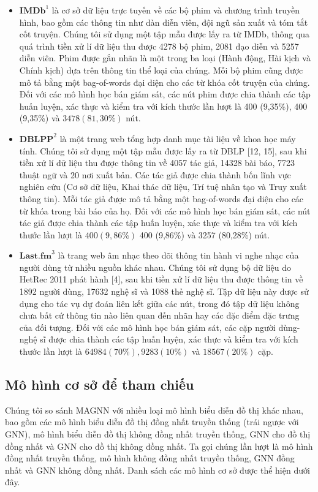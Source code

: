 \begin{itemize}
  \item $\mathbf{IMDb}^{1}$ là cơ sở dữ liệu trực tuyến về các bộ phim và chương trình truyền hình, bao gồm các thông tin như dàn diễn viên, đội ngũ sản xuất và tóm tắt cốt truyện. Chúng tôi sử dụng một tập mẫu được lấy ra từ IMDb, thông qua quá trình tiền xử lí dữ liệu thu được 4278 bộ phim, 2081 đạo diễn và 5257 diễn viên. Phim được gắn nhãn là một trong ba loại (Hành động, Hài kịch và Chính kịch) dựa trên thông tin thể loại của chúng. Mỗi bộ phim cũng được mô tả bằng một bag-of-words đại diện cho các từ khóa cốt truyện của chúng. Đối với các mô hình học bán giám sát, các nút phim được chia thành các tập huấn luyện, xác thực và kiểm tra với kích thước lần lượt là 400 (9,35\%), 400 (9,35\%) và $3478(81,30 \%)$ nút.
  \item $\mathbf{DBLPP}^{2}$ là một trang web tổng hợp danh mục tài liệu về khoa học máy tính. Chúng tôi sử dụng một tập mẫu được lấy ra từ DBLP [12, 15], sau khi tiền xử lí dữ liệu thu được thông tin về 4057 tác giả, 14328 bài báo, 7723 thuật ngữ và 20 nơi xuất bản. Các tác giả được chia thành bốn lĩnh vực nghiên cứu (Cơ sở dữ liệu, Khai thác dữ liệu, Trí tuệ nhân tạo và Truy xuất thông tin). Mỗi tác giả được mô tả bằng một bag-of-words đại diện cho các từ khóa trong bài báo của họ. Đối với các mô hình học bán giám sát, các nút tác giả được chia thành các tập huấn luyện, xác thực và kiểm tra với kích thước lần lượt là $400(9,86 \%)$ 400 (9,86\%) và 3257 (80,28\%) nút.
  \item $\mathbf{Last.fm}^{3}$ là trang web âm nhạc theo dõi thông tin hành vi nghe nhạc của người dùng từ nhiều nguồn khác nhau. Chúng tôi sử dụng bộ dữ liệu do HetRec 2011 phát hành [4], sau khi tiền xử lí dữ liệu thu được thông tin về 1892 người dùng, 17632 nghệ sĩ và 1088 thẻ nghệ sĩ. Tập dữ liệu này được sử dụng cho tác vụ dự đoán liên kết giữa các nút, trong đó tập dữ liệu không chưa bất cứ thông tin nào liên quan đến nhãn hay các đặc điểm đặc trưng của đối tượng. Đối với các mô hình học bán giám sát, các cặp người dùng-nghệ sĩ được chia thành các tập huấn luyện, xác thực và kiểm tra với kích thước lần lượt là $64984(70 \%), 9283(10 \%)$ và $18567(20 \%)$ cặp.
\end{itemize}

\subsection{Mô hình cơ sở để tham chiếu}
Chúng tôi so sánh MAGNN với nhiều loại mô hình biểu diễn đồ thị khác nhau, bao gồm các mô hình biểu diễn đồ thị đồng nhất truyền thống (trái ngược với GNN), mô hình biểu diễn đồ thị không đồng nhất truyền thống, GNN cho đồ thị đồng nhất và GNN cho đồ thị không đồng nhất. Ta gọi chúng lần lượt là mô hình đồng nhất truyền thống, mô hình không đồng nhất truyền thống, GNN đồng nhất và GNN không đồng nhất. Danh sách các mô hình cơ sở được thể hiện dưới đây.

